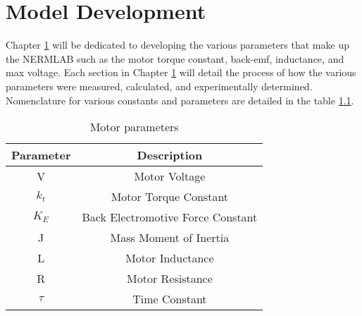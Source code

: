 
\cleardoublepage


\chapter{Model Development}
\label{chp3}

Chapter \ref{chp3} will be dedicated to developing the various parameters that make up the NERMLAB such as the motor torque constant, \ac{back-emf}, inductance, and max voltage. Each section in Chapter \ref{chp3} will detail the process of how the various parameters were measured, calculated, and experimentally determined. Nomenclature for various constants and parameters are detailed in the table \ref{table2}.

\begin{table}[ht]
\begin{center}
\caption{Motor parameters}
\begin{tabular}[c]{|c|c|}

\hline
\textbf{Parameter} & \textbf{Description}\\

\hline
V & Motor Voltage\\

\hline
\(k_t\) & Motor Torque Constant\\

\hline
\(K_E\) & Back Electromotive Force Constant\\

\hline
J & Mass Moment of Inertia\\

\hline
L & Motor Inductance\\

\hline
R & Motor Resistance\\

\hline
\(\tau\) & Time Constant\\

\hline
\end{tabular}

\label{table2}
\end{center}
\end{table}

